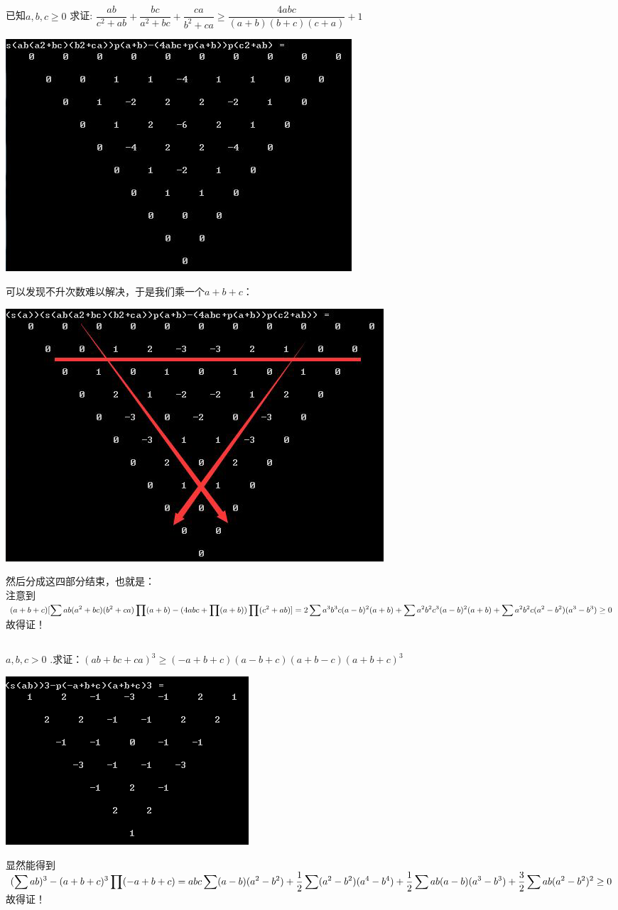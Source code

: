\documentclass[UTF8]{ctexart}
\begin{document}
\subsection{}
已知$  a, b, c \geq 0 $ 求证:
$ \dfrac{a b}{c^{2}+a b}+\dfrac{b c}{a^{2}+b c}+\dfrac{c a}{b^{2}+c a} \geq \dfrac{4 a b c}{(a+b)(b+c)(c+a)}+1 $
\begin{center}
	\includegraphics[width=0.5\linewidth]{a31}
\end{center}
可以发现不升次数难以解决，于是我们乘一个$ a+b+c $：
\begin{center}
	\includegraphics[width=0.5\linewidth]{a32}
\end{center}
然后分成这四部分结束，也就是：\\
注意到$ (a+b+c)[\displaystyle \sum  ab(a^{2}+bc)(b^{2}+ca)\displaystyle \prod (a+b)-(4abc+\displaystyle \prod (a+b))\displaystyle \prod (c^{2}+ab)]=\\
2\displaystyle \sum  a^{3}b^{3}c(a-b)^{2}(a+b)+\displaystyle \sum   a^{2}b^{2}c^{3}(a-b)^{2}(a+b)+\displaystyle \sum  a^{2}b^{2}c(a^{2}-b^{2})(a^{3}-b^{3})\ge 0 $故得证！
\subsection{}
 $ a, b, c>0 $ .求证：$ (a b+b c+c a)^{3} \geq(-a+b+c)(a-b+c)(a+b-c)(a+b+c)^{3} $
\begin{center}
	\includegraphics[width=0.5\linewidth]{a33}
\end{center}
显然能得到$ (\displaystyle \sum  ab)^3-(a+b+c)^3\displaystyle \prod (-a+b+c)=\\
abc\displaystyle \sum  (a-b)(a^2-b^2)+\dfrac{1}{2} \displaystyle \sum  (a^2-b^2)(a^4-b^4)+\dfrac{1}{2} \displaystyle \sum  ab(a-b)(a^3-b^3)+\dfrac{3}{2}\displaystyle \sum  ab(a^2-b^2)^2 \ge 0 $故得证！
\end{document}
